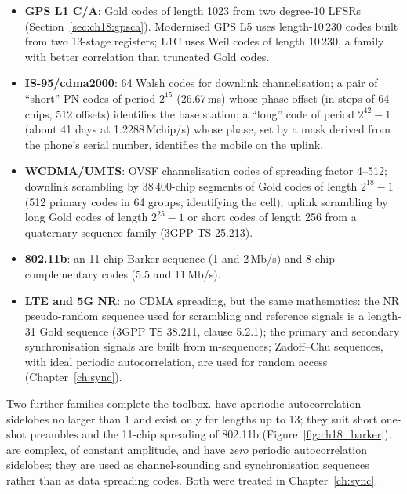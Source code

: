 
\begin{inpractice}
\begin{itemize}
\item \textbf{GPS L1 C/A}: Gold codes of length 1023 from two degree-10 LFSRs
(Section~\ref{sec:ch18:gpsca}). Modernised GPS L5 uses length-10\,230 codes built from
two 13-stage registers; L1C uses Weil codes of length 10\,230, a family with better
correlation than truncated Gold codes.
\item \textbf{IS-95/cdma2000}: 64 Walsh codes for downlink channelisation; a pair of
``short'' PN codes of period $2^{15}$ (26.67\,ms) whose phase offset (in steps of 64 chips,
512 offsets) identifies the base station; a ``long'' code of period $2^{42}-1$ (about 41
days at 1.2288\,Mchip/s) whose phase, set by a mask derived from the phone's serial number,
identifies the mobile on the uplink.
\item \textbf{WCDMA/UMTS}: OVSF channelisation codes of spreading factor 4--512; downlink
scrambling by 38\,400-chip segments of Gold codes of length $2^{18}-1$ (512 primary codes in
64 groups, identifying the cell); uplink scrambling by long Gold codes of length $2^{25}-1$
or short codes of length 256 from a quaternary sequence family (3GPP TS 25.213).
\item \textbf{802.11b}: an 11-chip Barker sequence (1 and 2\,Mb/s) and 8-chip complementary
codes (5.5 and 11\,Mb/s).
\item \textbf{LTE and 5G NR}: no CDMA spreading, but the same mathematics: the NR
pseudo-random sequence used for scrambling and reference signals is a length-31 Gold
sequence (3GPP TS 38.211, clause 5.2.1); the primary and secondary synchronisation
signals are built from m-sequences; Zadoff--Chu sequences, with ideal periodic
autocorrelation, are used for random access (Chapter~\ref{ch:sync}).
\end{itemize}
\end{inpractice}

Two further families complete the toolbox.  have aperiodic
autocorrelation sidelobes no larger than 1 and exist only for lengths up to 13; they suit
short one-shot preambles and the 11-chip spreading of 802.11b (Figure~\ref{fig:ch18_barker}).
 are complex, of constant amplitude, and have \emph{zero} periodic
autocorrelation sidelobes; they are used as channel-sounding and synchronisation sequences rather
than as data spreading codes. Both were treated in Chapter~\ref{ch:sync}.


